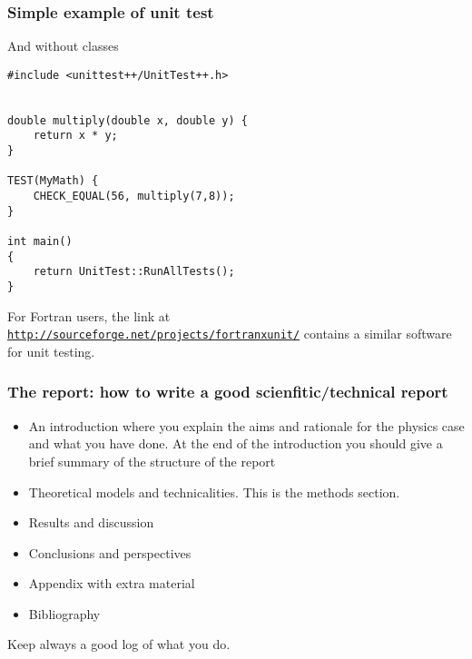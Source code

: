 \documentclass{beamer}
\newenvironment{block_mdfboxadmon}[1][]{\begin{block}{#1}}{\end{block}}
\begin{document}
\begin{frame}
\frametitle{Simple example of unit test}

\begin{block_mdfboxadmon}[]
And without classes
\begin{verbatim}
#include <unittest++/UnitTest++.h>


double multiply(double x, double y) {
    return x * y;
}

TEST(MyMath) {
    CHECK_EQUAL(56, multiply(7,8));
}

int main()
{
    return UnitTest::RunAllTests();
} 
\end{verbatim}
For Fortran users, the link at \href{{http://sourceforge.net/projects/fortranxunit/}}{\nolinkurl{http://sourceforge.net/projects/fortranxunit/}} contains a similar
software for unit testing.
\end{block_mdfboxadmon}
\end{frame}

\begin{frame}
\frametitle{The report: how to write a good scienfitic/technical report}

\begin{block_mdfboxadmon}
\begin{itemize}
 \item An introduction where you explain the aims and rationale for the physics case and  what you have done. At the end of the introduction you should give a brief summary of the structure of the report

 \item Theoretical models and technicalities. This is the methods section.

 \item Results and discussion

 \item Conclusions and perspectives

 \item Appendix with extra material

 \item Bibliography
\end{itemize}

\noindent
Keep always a good log of what you do.
\end{block_mdfboxadmon}
\end{frame}
\end{document}
